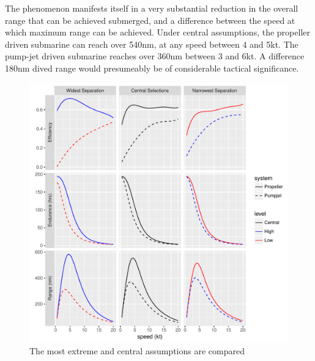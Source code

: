 \documentclass{article}\usepackage[]{graphicx}\usepackage[]{color}
\makeatletter
\def\maxwidth{ %
  \ifdim\Gin@nat@width>\linewidth
    \linewidth
  \else
    \Gin@nat@width
  \fi
}
\newenvironment{knitrout}{}{} %
\makeatother
\begin{document}
The phenomenon manifests itself in a very substantial reduction in the overall range that can be achieved submerged, and a difference between the speed at which maximum range can be achieved.  Under central assumptions, the propeller driven submarine can reach over 540nm, at any speed between 4 and 5kt. The pump-jet driven submarine reaches over 360nm between 3 and 6kt. A difference 180nm dived range would presumeably be of considerable tactical significance.



\begin{figure}
\begin{knitrout}
\color{fgcolor}

{\centering \includegraphics[width=\maxwidth]{figures/plots-plot_results1-1} 

}



\end{knitrout}
\caption{The most extreme and central assumptions are compared}
\label{fig:central_extreme}
\end{figure}
\end{document}
